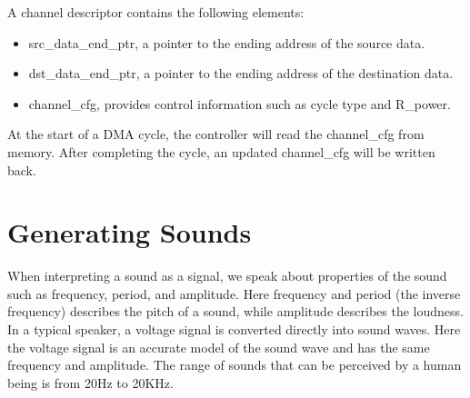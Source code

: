 A channel descriptor contains the following elements:
\begin{itemize}
	\item src\_data\_end\_ptr, a pointer to the ending address of the source data.
	\item dst\_data\_end\_ptr, a pointer to the ending address of the destination data.
	\item channel\_cfg, provides control information such as cycle type and R\_power.
\end{itemize}
At the start of a DMA cycle, the controller will read the channel\_cfg from memory. After completing the cycle, an updated channel\_cfg will be written back.


\section{Generating Sounds}
When interpreting a sound as a signal, we speak about properties of the sound such as frequency, period, and amplitude. Here frequency and period (the inverse frequency) describes the pitch of a sound, while amplitude describes the loudness. In a typical speaker, a voltage signal is converted directly into sound waves. Here the voltage signal is an accurate model of the sound wave and has the same frequency and amplitude. The range of sounds that can be perceived by a human being is from 20Hz to 20KHz.\cite{compendium}
